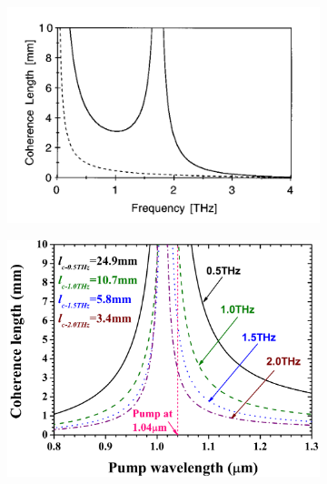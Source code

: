 \begin{figure}
    \centering
    \begin{subfigure}{.5\textwidth}%
        \centering
        \includegraphics[width=\textwidth]{refferenced_pic/coherence_length_ZnTe.png}
        \caption{}
        \label{fig:coherence_legnth}
    \end{subfigure}%
    \hfill
    \begin{subfigure}{.5\textwidth}%
        \centering
        \includegraphics[width=\textwidth]{PLots/GAP_coherencelength.png}

\end{subfigure}
\end{figure}
